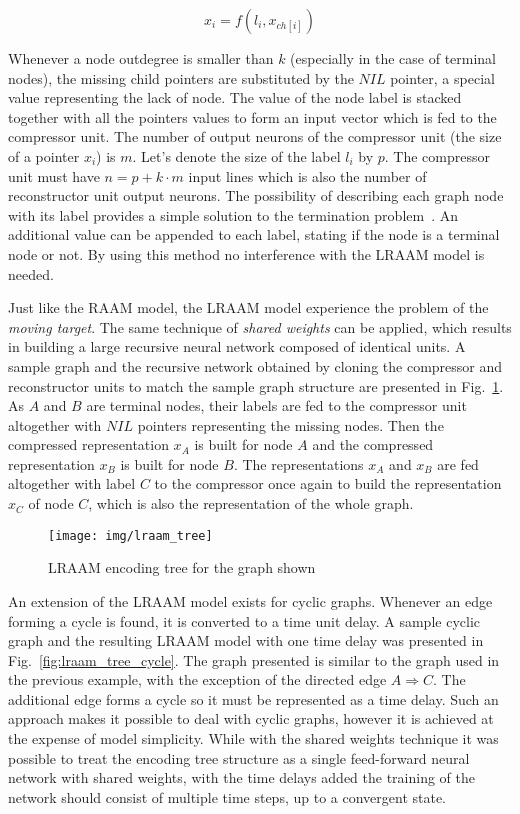 \begin{equation}
x_i = f(l_i, x_{ch[i]})
\label{eq:lraam_pointer}
\end{equation}

Whenever a node outdegree is smaller than $k$ (especially in the case of terminal nodes), the missing child pointers are substituted by the $NIL$ pointer, a special value representing the lack of node. The value of the node label is stacked together with all the pointers values to form an input vector which is fed to the compressor unit. The number of output neurons of the compressor unit (the size of a pointer $x_i$) is $m$. Let's denote the size of the label $l_i$ by $p$. The compressor unit must have $n = p + k \cdot m$ input lines which is also the number of reconstructor unit output neurons. The possibility of describing each graph node with its label provides a simple solution to the termination problem~\cite{sperduti1994labelling}. An additional value can be appended to each label, stating if the node is a terminal node or not. By using this method no interference with the LRAAM model is needed.

Just like the RAAM model, the LRAAM model experience the problem of the \emph{moving target}. The same technique of \emph{shared weights} can be applied, which results in building a large recursive neural network composed of identical units. A sample graph and the recursive network obtained by cloning the compressor and reconstructor units to match the sample graph structure are presented in Fig.~\ref{fig:lraam_tree}. As $A$ and $B$ are terminal nodes, their labels are fed to the compressor unit altogether with $NIL$ pointers representing the missing nodes. Then the compressed representation $x_{A}$ is built for node $A$ and the compressed representation $x_{B}$ is built for node $B$. The representations $x_A$ and $x_B$ are fed altogether with label $C$ to the compressor once again to build the representation $x_C$ of node $C$, which is also the representation of the whole graph.

\begin{figure}
\begin{center}
	\texttt{[image: img/lraam\_tree]}
	\caption{LRAAM encoding tree for the graph shown}
	\label{fig:lraam_tree}
\end{center}
\end{figure}

An extension of the LRAAM model exists for cyclic graphs. Whenever an edge forming a cycle is found, it is converted to a time unit delay. A sample cyclic graph and the resulting LRAAM model with one time delay was presented in Fig.~\ref{fig:lraam_tree_cycle}. The graph presented is similar to the graph used in the previous example, with the exception of the directed edge $A \Rightarrow C$. The additional edge forms a cycle so it must be represented as a time delay. Such an approach makes it possible to deal with cyclic graphs, however it is achieved at the expense of model simplicity. While with the shared weights technique it was possible to treat the encoding tree structure as a single feed-forward neural network with shared weights, with the time delays added the training of the network should consist of multiple time steps, up to a convergent state.


